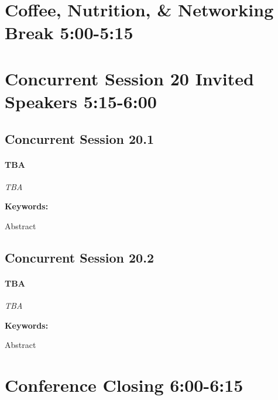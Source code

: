 \documentclass[
]{book}
\begin{document}
\hypertarget{coffee-nutrition-networking-break-500-515-1}{%
\section*{Coffee, Nutrition, \& Networking Break \textbar{} 5:00-5:15}\label{coffee-nutrition-networking-break-500-515-1}}

\hypertarget{concurrent-session-20-invited-speakers-515-600}{%
\section*{Concurrent Session 20 \textbar{} Invited Speakers \textbar{} 5:15-6:00}\label{concurrent-session-20-invited-speakers-515-600}}

\hypertarget{concurrent-session-20.1}{%
\subsection*{Concurrent Session 20.1}\label{concurrent-session-20.1}}

\begin{speaker}
\hypertarget{tba}{%
\paragraph{\texorpdfstring{\textbf{TBA}}{TBA}}\label{tba}}

\emph{TBA}

\textbf{Keywords:}

Abstract
\end{speaker}

\hypertarget{concurrent-session-20.2}{%
\subsection*{Concurrent Session 20.2}\label{concurrent-session-20.2}}

\begin{speaker}
\hypertarget{tba}{%
\paragraph{\texorpdfstring{\textbf{TBA}}{TBA}}\label{tba}}

\emph{TBA}

\textbf{Keywords:}

Abstract
\end{speaker}

\hypertarget{conference-closing-600-615}{%
\section*{Conference Closing \textbar{} 6:00-6:15}\label{conference-closing-600-615}}

  
\end{document}
